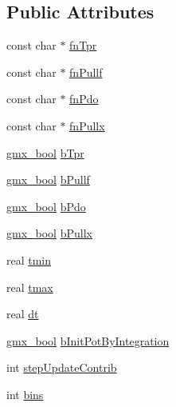 \subsection*{\-Public \-Attributes}
\begin{DoxyCompactItemize}
\item 
const char $\ast$ \hyperlink{structt__UmbrellaOptions_ae970cb788e95a0339020bc054d2fe572}{fn\-Tpr}
\item 
const char $\ast$ \hyperlink{structt__UmbrellaOptions_a2a500def8a1b5d8483686b0277025ef8}{fn\-Pullf}
\item 
const char $\ast$ \hyperlink{structt__UmbrellaOptions_a251340e0d33e94d695d650d7673ad8cd}{fn\-Pdo}
\item 
const char $\ast$ \hyperlink{structt__UmbrellaOptions_a14d05c6e666cbaf71169021723e83c22}{fn\-Pullx}
\item 
\hyperlink{include_2types_2simple_8h_a8fddad319f226e856400d190198d5151}{gmx\-\_\-bool} \hyperlink{structt__UmbrellaOptions_a9bad9a5993f49d8fba7b13fd52d7159e}{b\-Tpr}
\item 
\hyperlink{include_2types_2simple_8h_a8fddad319f226e856400d190198d5151}{gmx\-\_\-bool} \hyperlink{structt__UmbrellaOptions_a7a97ea3be3ea6413747f2dc2036aca38}{b\-Pullf}
\item 
\hyperlink{include_2types_2simple_8h_a8fddad319f226e856400d190198d5151}{gmx\-\_\-bool} \hyperlink{structt__UmbrellaOptions_a164e1d1532452f72358904a8c67d57dd}{b\-Pdo}
\item 
\hyperlink{include_2types_2simple_8h_a8fddad319f226e856400d190198d5151}{gmx\-\_\-bool} \hyperlink{structt__UmbrellaOptions_a2d2acf04243e2dcd9752ac0fff3410f4}{b\-Pullx}
\item 
real \hyperlink{structt__UmbrellaOptions_a5f284db1e8b6436a09c1d4170bd25e74}{tmin}
\item 
real \hyperlink{structt__UmbrellaOptions_aa7bbcabc689ff895a5dea49ae840cf31}{tmax}
\item 
real \hyperlink{structt__UmbrellaOptions_a96e1f5d271d5f36555b542e32c13b719}{dt}
\item 
\hyperlink{include_2types_2simple_8h_a8fddad319f226e856400d190198d5151}{gmx\-\_\-bool} \hyperlink{structt__UmbrellaOptions_a2da05a19e58a07ead9f84a8111266f8c}{b\-Init\-Pot\-By\-Integration}
\item 
int \hyperlink{structt__UmbrellaOptions_a8a5dc92092cafe96e4aa0c65cb96db88}{step\-Update\-Contrib}
\item 
int \hyperlink{structt__UmbrellaOptions_a05198e9f352f8794b0c2da3de36e90f3}{bins}
\item 

\end{DoxyCompactItemize}
